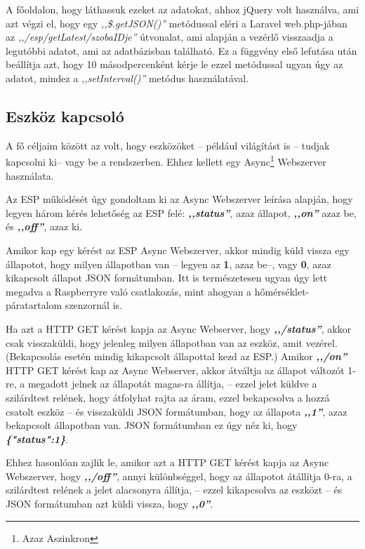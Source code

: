 \documentclass[
]{thesis-ekf}
\theoremstyle{definition}
\theoremstyle{remark}
\begin{document}
	A főoldalon, hogy láthassuk ezeket az adatokat, ahhoz jQuery volt használva, ami azt végzi el, hogy egy \emph{,,\$.getJSON()''} metódussal eléri a Laravel web.php-jában az \emph{,,/esp/getLatest/szobaIDje''} útvonalat, ami alapján a vezérlő visszaadja a legutóbbi adatot, ami az adatbázisban található. Ez a függvény első lefutása után beállítja azt, hogy 10 másodpercenként kérje le ezzel metódussal ugyan úgy az adatot, mindez a \emph{,,setInterval()''} metódus használatával.
	
	\subsection{Eszköz kapcsoló}\label{toggle}
	
	A fő céljaim között az volt, hogy eszközöket -- például világítást is -- tudjak kapcsolni ki-- vagy be a rendszerben.  Ehhez kellett egy Async\footnote{Azaz Aszinkron} Webszerver\cite{async-webserver} használata.
	
	Az ESP működését úgy gondoltam ki az Async Webszerver leírása alapján, hogy legyen három kérés lehetőség az ESP felé: \emph{\textbf{,,status''}}, azaz állapot, \emph{\textbf{,,on''}} azaz be, és \emph{\textbf{,,off''}}, azaz ki. 
	
	Amikor kap egy kérést az ESP Async Webszerver, akkor mindig küld vissza egy állapotot, hogy milyen állapotban van -- legyen az \textbf{1}, azaz be--, vagy \textbf{0}, azaz kikapcsolt állapot JSON formátumban. Itt is természetesen ugyan úgy lett megadva a Raspberryre való csatlakozás, mint ahogyan a hőmérséklet-páratartalom szenzornál is.
	
	Ha azt a HTTP GET kérést kapja az Async Webserver, hogy \emph{\textbf{,,/status''}}, akkor csak visszaküldi, hogy jelenleg milyen állapotban van az eszköz, amit vezérel. (Bekapcsolás esetén mindig kikapcsolt állapottal kezd az ESP.) Amikor \emph{\textbf{,,/on''}} HTTP GET kérést kap az Async Webserver, akkor átváltja az állapot változót 1-re, a megadott jelnek az állapotát magas-ra állítja, -- ezzel jelet küldve a szilárdtest relének, hogy átfolyhat rajta az áram, ezzel bekapcsolva a hozzá csatolt eszköz -- és visszaküldi JSON formátumban, hogy az állapota \emph{\textbf{,,1''}}, azaz bekapcsolt állapotban van. JSON formátumban ez úgy néz ki, hogy \textbf{\emph{\{"status":1\}}}.
	
	Ehhez hasonlóan zajlik le, amikor azt a HTTP GET kérést kapja az Async Webszerver, hogy \emph{\textbf{,,/off''}}, annyi különbséggel, hogy az állapotot átállítja 0-ra, a szilárdtest relének a jelet alacsonyra állítja, -- ezzel kikapcsolva az eszközt -- és JSON formátumban azt küldi vissza, hogy \emph{\textbf{,,0''}}.
	
\end{document}
